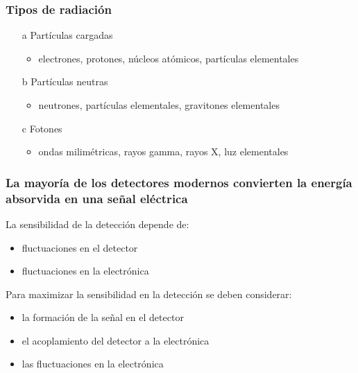 \documentclass{beamer}
\begin{document}
\begin{frame}
\frametitle{Tipos de radiación}
\begin{alertblock}{}
\begin{itemize}
\item[a] Partículas cargadas 
\begin{itemize}
\item {\color{blue}electrones, protones, núcleos atómicos, partículas
elementales} 
\end{itemize}
\item[b] Partículas neutras 
				\begin{itemize}
\item {\color{blue}neutrones, partículas elementales, gravitones
elementales} 
				\end{itemize}
\item[c] Fotones 
				\begin{itemize}
\item {\color{blue}ondas milimétricas, rayos gamma, rayos X, luz
elementales} 
				\end{itemize}
				\end{itemize}
				\end{alertblock}
				\end{frame}

				\begin{frame}
\frametitle{La mayoría de los detectores modernos convierten la
energía absorvida en una señal eléctrica}
\begin{alertblock}{La sensibilidad de la detección depende de:}
\begin{itemize}
\item fluctuaciones en el detector
\item fluctuaciones en la electrónica
\end{itemize}
\end{alertblock}
\begin{exampleblock}{Para maximizar la sensibilidad en la detección se
deben considerar:}
\begin{itemize}
\item la formación de la señal en el detector
\item el acoplamiento del detector a la electrónica
\item las fluctuaciones en la electrónica
\end{itemize}
\end{exampleblock}
\end{frame}
\end{document}
